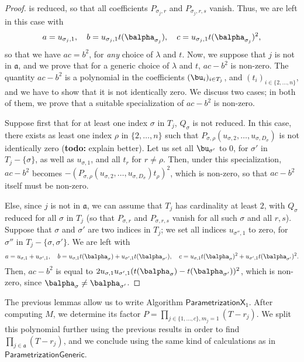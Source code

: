 \documentclass[12pt]{article}
\def\todo#1{(\textbf{todo:} #1)}
\begin{document}
\begin{proof}
	is reduced, so that all coefficients $P_{\sigma_j,r}$ and
	$P_{\sigma_j,r,s}$ vanish. Thus, we are left in
	this case with
	$$
	a = u_{\sigma_j,1}, \quad
	b = u_{\sigma_j,1} t(\balpha_{\sigma_j}), \quad
	c = u_{\sigma_j,1} t(\balpha_{\sigma_j})^2,
	$$ so that we have $ac=b^2$, for {\em any} choice of $\lambda$ and
	$t$. Now, we suppose that $j$ is not in $\mathfrak{a}$, and we prove
	that for a generic choice of $\lambda$ and $t$, $ac-b^2$ is non-zero.
	The quantity $ac-b^2$ is a polynomial in the coefficients
	$(\bu_i)_{i\in T_j}$, and $(t_i)_{i \in \{2,\dots,n\}}$, and we have
	to show that it is not identically zero. We discuss two cases; in both
	of them, we prove that a suitable specialization of $ac-b^2$ is
	non-zero.
	
	Suppose first that for at least one index $\sigma$ in $T_j$,
	$Q_\sigma$ is not reduced. In this case, there exists as least one
	index $\rho$ in $\{2,\dots,n\}$ such that
	$P_{\sigma,\rho}(u_{\sigma,2},\dots,u_{\sigma,D_\sigma})$ is not
	identically zero \todo{explain better}. Let us set all $\bu_{\sigma'}$
	to $0$, for $\sigma'$ in $T_j-\{\sigma\}$, as well as $u_{\sigma,1}$,
	and all $t_r$ for $r\ne \rho$. Then, under this specialization,
	$ac-b^2$ becomes
	$-(P_{\sigma,\rho}(u_{\sigma,2},\dots,u_{\sigma,D_\sigma})t_\rho)^2$,
	which is non-zero, so that $ac-b^2$ itself must be non-zero.
	
	Else, since $j$ is not in $\mathfrak{a}$, we can assume that $T_j$
	has cardinality at least $2$, with $Q_\sigma$ reduced for all $\sigma$
	in $T_j$ (so that $P_{\sigma,r}$ and $P_{\sigma,r,s}$ vanish for 
	all such $\sigma$ and all $r,s$). Suppose that $\sigma$ and $\sigma'$ are two indices in
	$T_j$; we set all indices $u_{\sigma'',1}$ to zero, for $\sigma''$
	in $T_j-\{\sigma,\sigma'\}$. We are left with
	$$
	a=u_{\sigma,1}+u_{\sigma',1},\quad
	b=u_{\sigma,1}t(\balpha_{\sigma})+u_{\sigma',1}t(\balpha_{\sigma'}),\quad
	c=u_{\sigma,1}t(\balpha_{\sigma})^2+u_{\sigma',1}t(\balpha_{\sigma'})^2.
	$$
	Then, $ac-b^2$ is equal to $2u_{\sigma,1}u_{\sigma',1}(t(\balpha_{\sigma})-t(\balpha_{\sigma'}))^2$,
	which is non-zero, since $\balpha_\sigma \ne \balpha_{\sigma'}$.
\end{proof}

The previous lemmas allow us to write Algorithm
$\mathsf{ParametrizationX}_1$. After computing $M$, we determine its
factor $P=\prod_{j \in \{1,\dots,c\}, m_j=1} (T-r_j)$. We split this
polynomial further using the previous results in order to find
$\prod_{j \in \mathfrak{a}} (T-r_j)$, and we conclude using the same
kind of calculations as in $\mathsf{ParametrizationGeneric}$.
\end{document}
